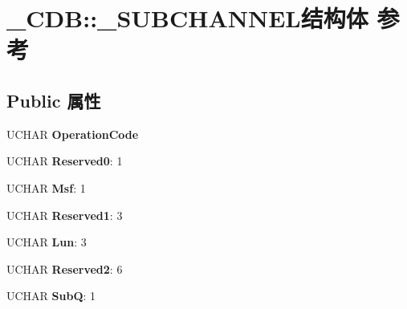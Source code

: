\hypertarget{struct___c_d_b_1_1___s_u_b_c_h_a_n_n_e_l}{}\section{\+\_\+\+C\+DB\+:\+:\+\_\+\+S\+U\+B\+C\+H\+A\+N\+N\+E\+L结构体 参考}
\label{struct___c_d_b_1_1___s_u_b_c_h_a_n_n_e_l}
\subsection*{Public 属性}
\begin{DoxyCompactItemize}
\item 
\mbox{\label{struct___c_d_b_1_1___s_u_b_c_h_a_n_n_e_l_a7ebd3d407edf5aa23ea44d28b1418971}} 
U\+C\+H\+AR {\bfseries Operation\+Code}
\item 
\mbox{\label{struct___c_d_b_1_1___s_u_b_c_h_a_n_n_e_l_a787222f23b5e66fb22e861d7bcdda550}} 
U\+C\+H\+AR {\bfseries Reserved0}\+: 1
\item 
\mbox{\label{struct___c_d_b_1_1___s_u_b_c_h_a_n_n_e_l_a56260d1c66e05554e1381177edc053fb}} 
U\+C\+H\+AR {\bfseries Msf}\+: 1
\item 
\mbox{\label{struct___c_d_b_1_1___s_u_b_c_h_a_n_n_e_l_aa063813cf85cb691f81a98ce190211ff}} 
U\+C\+H\+AR {\bfseries Reserved1}\+: 3
\item 
\mbox{\label{struct___c_d_b_1_1___s_u_b_c_h_a_n_n_e_l_aa8ff9515ca47e3d0ace29a8b0ef05590}} 
U\+C\+H\+AR {\bfseries Lun}\+: 3
\item 
\mbox{\label{struct___c_d_b_1_1___s_u_b_c_h_a_n_n_e_l_a555765e083f489b246f19baf4d8967a8}} 
U\+C\+H\+AR {\bfseries Reserved2}\+: 6
\item 
\mbox{\label{struct___c_d_b_1_1___s_u_b_c_h_a_n_n_e_l_ac27ff684a2061688b99011d20b864619}} 
U\+C\+H\+AR {\bfseries SubQ}\+: 1
\item 
\mbox{\label{struct___c_d_b_1_1___s_u_b_c_h_a_n_n_e_l_a8810beca6d2469fcb3e0404784ecfeb6}} 

\end{DoxyCompactItemize}
